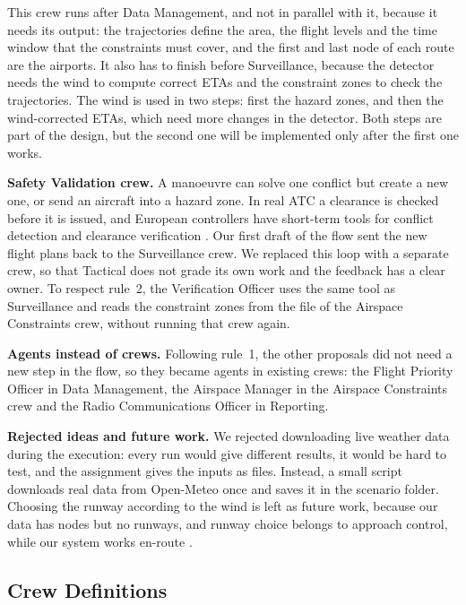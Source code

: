 This crew runs after Data Management, and not in parallel with it, because it needs its
output: the trajectories define the area, the flight levels and the time window that the
constraints must cover, and the first and last node of each route are the airports. It also
has to finish before Surveillance, because the detector needs the wind to compute correct ETAs
and the constraint zones to check the trajectories. The wind is used in two steps:
first the hazard zones, and then the wind-corrected ETAs, which need more changes in the
detector. Both steps are part of the design, but the second one will be implemented only
after the first one works.

\textbf{Safety Validation crew.} A manoeuvre can solve one conflict but create a new one,
or send an aircraft into a hazard zone. In real ATC a clearance is checked before it is
issued, and European controllers have short-term tools for conflict detection and
clearance verification \cite{skybrary_mtcd}. Our first draft of the flow sent the new
flight plans back to the Surveillance crew. We replaced this loop with a separate crew, so
that Tactical does not grade its own work and the feedback has a clear owner. To respect
rule~2, the Verification Officer uses the same tool as Surveillance and reads the
constraint zones from the file of the Airspace Constraints crew, without running that crew
again.

\textbf{Agents instead of crews.} Following rule~1, the other proposals did not need a new
step in the flow, so they became agents in existing crews: the Flight Priority Officer in
Data Management, the Airspace Manager in the Airspace Constraints crew and the Radio
Communications Officer in Reporting.

\textbf{Rejected ideas and future work.} We rejected downloading live weather data during
the execution: every run would give different results, it would be hard to test, and the
assignment gives the inputs as files. Instead, a small script downloads real data from
Open-Meteo \cite{openmeteo_docs} once and saves it in the scenario folder. Choosing the
runway according to the wind is left as future work, because our data has nodes but no
runways, and runway choice belongs to approach control, while our system works en-route
\cite{skybrary_area_controller}.

\subsection{Crew Definitions}
\label{sec:crews}

